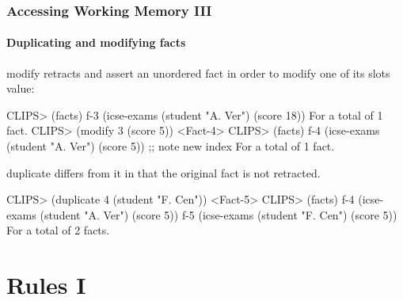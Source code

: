 \documentclass[xcolor={usenames,dvipsnames,svgnames}, compress]{beamer}
\begin{document}
\begin{frame}[fragile]
  \frametitle{Accessing Working Memory III}
  \framesubtitle{Duplicating and modifying facts}
  
  \textsf{modify} retracts and assert an unordered fact in order to modify one
  of its slots value:
  \begin{clips-code}
    CLIPS> (facts)
    f-3     (icse-exams (student "A. Ver") (score 18))
    For a total of 1 fact.
    CLIPS> (modify 3 (score 5))
    <Fact-4>
    CLIPS> (facts)
    f-4     (icse-exams (student "A. Ver") (score 5)) ;; note new index
    For a total of 1 fact.
  \end{clips-code}
  
  \textsf{duplicate} differs from it in that the original fact is not
  retracted.
  \begin{clips-code}[firstnumber=9]
    CLIPS> (duplicate 4 (student "F. Cen"))
    <Fact-5>
    CLIPS> (facts)
    f-4     (icse-exams (student "A. Ver") (score 5))
    f-5     (icse-exams (student "F. Cen") (score 5))
    For a total of 2 facts.
  \end{clips-code}
\end{frame}


  




\section{Rules I}
{
  \begin{frame}
    \sectionpage
  \end{frame}
}
\end{document}
